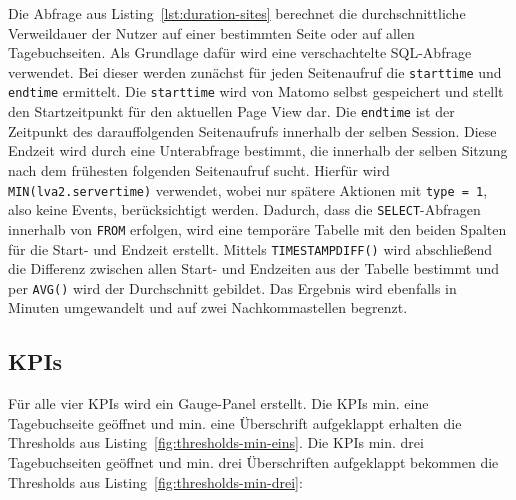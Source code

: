 \begin{figure}[H]
    \centering
    \begin{minipage}{\textwidth}
        
    \end{minipage}
\end{figure}

Die Abfrage aus Listing~\ref{lst:duration-sites} berechnet die durchschnittliche Verweildauer der Nutzer auf einer bestimmten Seite oder auf allen Tagebuchseiten. Als Grundlage dafür wird eine verschachtelte SQL-Abfrage verwendet. Bei dieser werden zunächst für jeden Seitenaufruf die \texttt{start\textunderscore time} und \texttt{end\textunderscore time} ermittelt. Die \texttt{start\textunderscore time} wird von Matomo selbst gespeichert und stellt den Startzeitpunkt für den aktuellen Page View dar. Die \texttt{end\textunderscore time} ist der Zeitpunkt des darauffolgenden Seitenaufrufs innerhalb der selben Session. Diese Endzeit wird durch eine Unterabfrage bestimmt, die innerhalb der selben Sitzung nach dem frühesten folgenden Seitenaufruf sucht. Hierfür wird \texttt{MIN(lva2.server\textunderscore time)} verwendet, wobei nur spätere Aktionen mit \texttt{type = 1}, also keine Events, berücksichtigt werden. Dadurch, dass die \texttt{SELECT}-Abfragen innerhalb von \texttt{FROM} erfolgen, wird eine temporäre Tabelle mit den beiden Spalten für die Start- und Endzeit erstellt. Mittels \texttt{TIMESTAMPDIFF()} wird abschließend die Differenz zwischen allen Start- und Endzeiten aus der Tabelle bestimmt und per \texttt{AVG()} wird der Durchschnitt gebildet. Das Ergebnis wird ebenfalls in Minuten umgewandelt und auf zwei Nachkommastellen begrenzt.

\subsection{KPIs}
Für alle vier KPIs wird ein Gauge-Panel erstellt. Die KPIs \glqq min. eine Tagebuchseite geöffnet\grqq{} und \glqq min. eine Überschrift aufgeklappt\grqq{} erhalten die Thresholds aus Listing~\ref{fig:thresholds-min-eins}. Die KPIs \glqq min. drei Tagebuchseiten geöffnet\grqq{} und \glqq min. drei Überschriften aufgeklappt\grqq{} bekommen die Thresholds aus Listing~\ref{fig:thresholds-min-drei}: 


